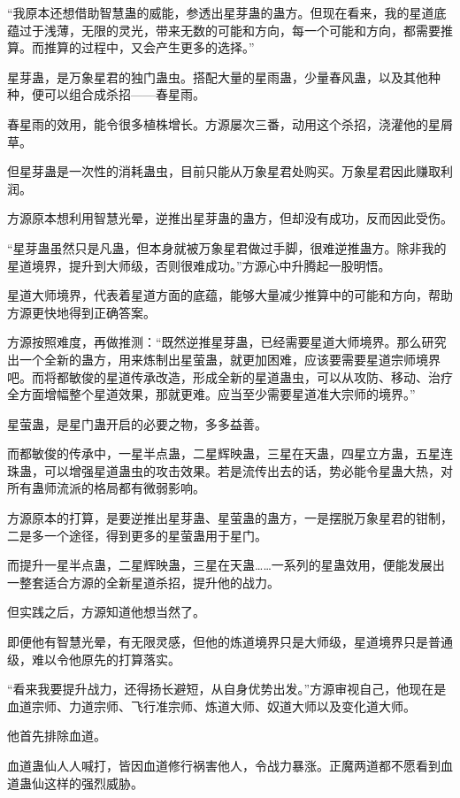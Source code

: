 \begin{this_body}
“我原本还想借助智慧蛊的威能，参透出星芽蛊的蛊方。但现在看来，我的星道底蕴过于浅薄，无限的灵光，带来无数的可能和方向，每一个可能和方向，都需要推算。而推算的过程中，又会产生更多的选择。”

星芽蛊，是万象星君的独门蛊虫。搭配大量的星雨蛊，少量春风蛊，以及其他种种，便可以组合成杀招——春星雨。

春星雨的效用，能令很多植株增长。方源屡次三番，动用这个杀招，浇灌他的星屑草。

但星芽蛊是一次性的消耗蛊虫，目前只能从万象星君处购买。万象星君因此赚取利润。

方源原本想利用智慧光晕，逆推出星芽蛊的蛊方，但却没有成功，反而因此受伤。

“星芽蛊虽然只是凡蛊，但本身就被万象星君做过手脚，很难逆推蛊方。除非我的星道境界，提升到大师级，否则很难成功。”方源心中升腾起一股明悟。

星道大师境界，代表着星道方面的底蕴，能够大量减少推算中的可能和方向，帮助方源更快地得到正确答案。

方源按照难度，再做推测：“既然逆推星芽蛊，已经需要星道大师境界。那么研究出一个全新的蛊方，用来炼制出星萤蛊，就更加困难，应该要需要星道宗师境界吧。而将都敏俊的星道传承改造，形成全新的星道蛊虫，可以从攻防、移动、治疗全方面增幅整个星道效果，那就更难。应当至少需要星道准大宗师的境界。”

星萤蛊，是星门蛊开启的必要之物，多多益善。

而都敏俊的传承中，一星半点蛊，二星辉映蛊，三星在天蛊，四星立方蛊，五星连珠蛊，可以增强星道蛊虫的攻击效果。若是流传出去的话，势必能令星蛊大热，对所有蛊师流派的格局都有微弱影响。

方源原本的打算，是要逆推出星芽蛊、星萤蛊的蛊方，一是摆脱万象星君的钳制，二是多一个途径，得到更多的星萤蛊用于星门。

而提升一星半点蛊，二星辉映蛊，三星在天蛊……一系列的星蛊效用，便能发展出一整套适合方源的全新星道杀招，提升他的战力。

但实践之后，方源知道他想当然了。

即便他有智慧光晕，有无限灵感，但他的炼道境界只是大师级，星道境界只是普通级，难以令他原先的打算落实。

“看来我要提升战力，还得扬长避短，从自身优势出发。”方源审视自己，他现在是血道宗师、力道宗师、飞行准宗师、炼道大师、奴道大师以及变化道大师。

他首先排除血道。

血道蛊仙人人喊打，皆因血道修行祸害他人，令战力暴涨。正魔两道都不愿看到血道蛊仙这样的强烈威胁。


\end{this_body}
